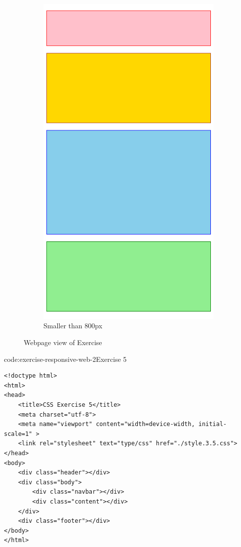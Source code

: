 \begin{figure}[htb]
\begin{subfigure}{.21\textwidth}
        \includegraphics[width=\textwidth]{images/css-designing-html/exercise-responsive-2-small.png}
        \caption{Smaller than 800px}
        \label{fig:exercise-responsive-2-small}
    \end{subfigure}
    \caption{Webpage view of Exercise}
    \label{fig:exercise-responsive-2}
\end{figure}

\begin{codeenv}{code:exercise-responsive-web-2}{Exercise 5}\begin{verbatim}
<!doctype html>
<html>
<head>
    <title>CSS Exercise 5</title>
    <meta charset="utf-8">
    <meta name="viewport" content="width=device-width, initial-scale=1" >
    <link rel="stylesheet" text="type/css" href="./style.3.5.css">
</head>
<body>
    <div class="header"></div>
    <div class="body">
        <div class="navbar"></div>
        <div class="content"></div>
    </div>
    <div class="footer"></div>
</body>
</html>
\end{verbatim}
\end{codeenv}
